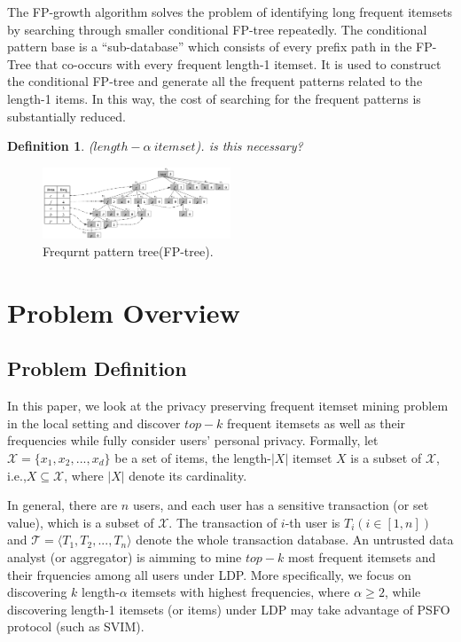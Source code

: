 \documentclass[conference]{IEEEtran}
\newtheorem{Definition}{\bf Definition}
\begin{document}
The FP-growth algorithm solves the problem of identifying long frequent itemsets by searching through smaller conditional FP-tree repeatedly. The conditional pattern base is a “sub-database” which consists of every prefix path in the FP-Tree that co-occurs with every frequent length-1 itemset. It is used to construct the conditional FP-tree and generate all the frequent patterns related to the length-1 items. In this way, the cost of searching for the frequent patterns is substantially reduced.

\begin{Definition}
($length-\alpha \ itemset$).  {\color{red} is this necessary? }
\end{Definition}

\begin{figure}[htbp]
\centerline{\includegraphics[width=0.5\textwidth]{tree.png}}
\caption{Frequrnt pattern tree(FP-tree).}
\label{fptree}
\end{figure}

\section{Problem Overview}

\subsection{Problem Definition}
In this paper, we look at the privacy preserving frequent itemset mining problem in the local setting and discover $top-k$ frequent itemsets as well as their frequencies while fully consider users' personal privacy. Formally, let $\mathcal{X} = \{x_1,x_2,...,x_d\}$ be a set of items, the length-$|X|$ itemset $X$ is a subset of $\mathcal{X}$, i.e.,$X \subseteq \mathcal{X}$, where $|X|$ denote its cardinality.

In general, there are $n$ users, and each user has a sensitive transaction (or set value), which is a subset of $\mathcal{X}$. The transaction of $i$-th user is $T_i(i \in [1,n])$ and $\mathcal{T} = \langle T_1,T_2,...,T_n \rangle$ denote the whole transaction database. An untrusted data analyst (or aggregator) is aimming to mine $top-k$ most frequent itemsets and their frquencies among all users under LDP. More specifically, we focus on discovering $k$ length-$\alpha$ itemsets with highest frequencies, where $\alpha \geq 2$, while discovering length-1 itemsets (or items) under LDP may take advantage of PSFO protocol (such as SVIM).
\end{document}
